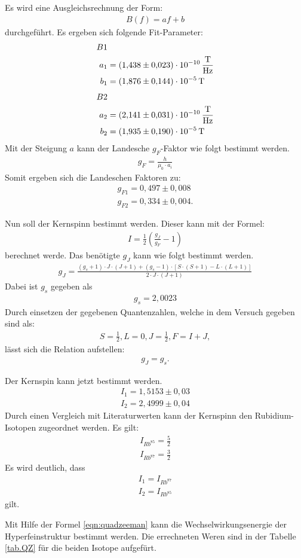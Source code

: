 Es wird eine Ausgleichsrechnung der Form:
\begin{align*}
  B(f)=af+b
\end{align*}
durchgeführt.
Es ergeben sich folgende Fit-Parameter:
\begin{align*}
  B1&\\
  a_1&=\SI{1.438\pm 0.023e-10}{\frac{T}{Hz}}\\
  b_1&=\SI{1.876\pm 0.144e-5}{T}
\end{align*}
\begin{align*}
  B2&\\
  a_2&=\SI{2.141\pm0.031e-10}{\frac{T}{Hz}}\\
  b_2&=\SI{1.935\pm0.190e-5}{T}
\end{align*}
\FloatBarrier
Mit der Steigung $a$ kann der Landesche $g_F$-Faktor wie folgt bestimmt werden.
\begin{align*}
  g_F = \frac{h}{\mu_0\cdot a_i}
\end{align*}
Somit ergeben sich die Landeschen Faktoren zu:
\begin{align*}
  g_{F1} = 0,497\pm0,008\\
  g_{F2} = 0,334\pm0,004.
\end{align*}

Nun soll der Kernspinn bestimmt werden.
Dieser kann mit der Formel:
\begin{align*}
  I = \frac{1}{2}\left(\frac{g_J}{g_F}-1\right)
\end{align*}
berechnet werde.
Das benötigte $g_J$ kann wie folgt bestimmt werden.
\begin{align*}
  g_J = \frac{(g_s+1)\cdot J\cdot(J+1)+(g_s-1)\cdot[S\cdot (S+1)-L\cdot (L+1)]}{2\cdot J \cdot (J+1)}
\end{align*}
Dabei ist $g_s$ gegeben als
\begin{align*}
  g_s = 2,0023
\end{align*}
Durch einsetzen der gegebenen Quantenzahlen, welche in dem Versuch gegeben sind als:
\begin{align*}
  S = \frac{1}{2}, L=0, J=\frac{1}{2}, F = I+J,
\end{align*}
lässt sich die Relation aufstellen:
\begin{align*}
  g_J=g_s.
\end{align*}

Der Kernspin kann jetzt bestimmt werden.
\begin{align*}
  I_1=1,5153\pm0,03\\
  I_2=2,4999\pm0,04
\end{align*}
Durch einen Vergleich mit Literaturwerten kann der Kernspinn den Rubidium-Isotopen zugeordnet werden.
Es gilt:
\begin{align*}
  I_{Rb^{85}}=\frac{5}{2}\\
  I_{Rb^{87}}=\frac{3}{2}
\end{align*}
Es wird deutlich, dass
\begin{align*}
  I_1=I_{Rb^{87}}\\
  I_2=I_{Rb^{85}}
\end{align*}
gilt.

Mit Hilfe der Formel \ref{eqn:quadzeeman} kann die Wechselwirkungsenergie der Hyperfeinstruktur bestimmt werden.
Die errechneten Weren sind in der Tabelle \ref{tab.QZ} für die beiden Isotope aufgefürt.

